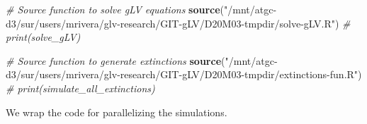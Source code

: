 \documentclass[
]{article}
\newenvironment{Shaded}{\begin{snugshade}}{\end{snugshade}}
\newcommand{\CommentTok}[1]{\textcolor[rgb]{0.56,0.35,0.01}{\textit{#1}}}
\newcommand{\FunctionTok}[1]{\textcolor[rgb]{0.13,0.29,0.53}{\textbf{#1}}}
\newcommand{\NormalTok}[1]{#1}
\newcommand{\StringTok}[1]{\textcolor[rgb]{0.31,0.60,0.02}{#1}}
\begin{document}
\begin{Shaded}
\begin{Highlighting}[]
\CommentTok{\# Source function to solve gLV equations}
\FunctionTok{source}\NormalTok{(}\StringTok{"/mnt/atgc{-}d3/sur/users/mrivera/glv{-}research/GIT{-}gLV/D20M03{-}tmpdir/solve{-}gLV.R"}\NormalTok{)}
\CommentTok{\# print(solve\_gLV)}
\end{Highlighting}
\end{Shaded}

\begin{Shaded}
\begin{Highlighting}[]
\CommentTok{\# Source function to generate extinctions}
\FunctionTok{source}\NormalTok{(}\StringTok{"/mnt/atgc{-}d3/sur/users/mrivera/glv{-}research/GIT{-}gLV/D20M03{-}tmpdir/extinctions{-}fun.R"}\NormalTok{)}
\CommentTok{\# print(simulate\_all\_extinctions)}
\end{Highlighting}
\end{Shaded}

We wrap the code for parallelizing the simulations.
\end{document}
